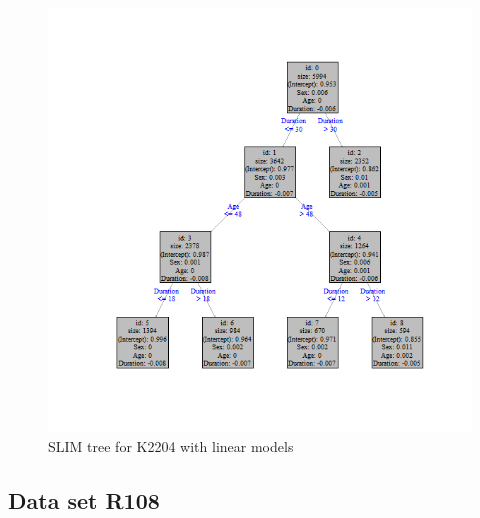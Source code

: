  \begin{figure}[!htb]
     \centering     
     \includegraphics[width = 16cm]{Figures/insurance_use_case/k2204_BPV/slim_lm_tree.png}
     \caption{SLIM tree for K2204 with linear models}
     \label{fig:ins_slim_lm_tree}
 \end{figure}
 
\subsection{Data set R108}